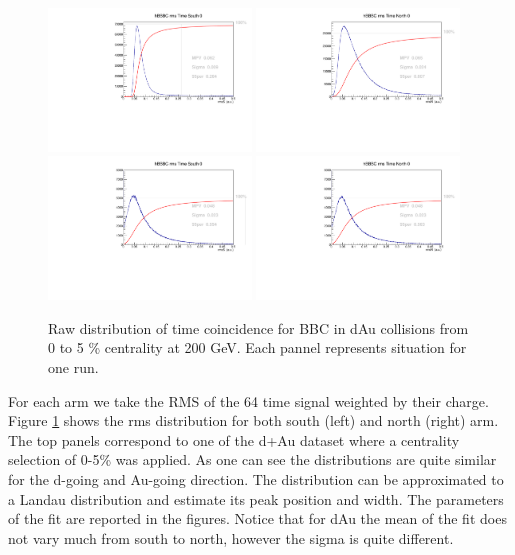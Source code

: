 \documentclass{article}
\begin{document}
\begin{figure}
\centering
\includegraphics[width=0.48\textwidth]{fig_pileup/dAu200MB_rmsSouth_455547}\hfil
\includegraphics[width=0.48\textwidth]{fig_pileup/dAu200MB_rmsNorth_455547}\\
\includegraphics[width=0.48\textwidth]{fig_pileup/pp200_rmsSouth_431739}\hfil
\includegraphics[width=0.48\textwidth]{fig_pileup/pp200_rmsNorth_431739}
\label{fig.dau200mb.bbctimetime}
\caption{Raw distribution of time coincidence for BBC in dAu collisions from 0 to 5 \% centrality at 200 GeV. Each pannel represents situation for one run.}
\end{figure}
For each arm we take the RMS of the 64 time signal weighted by their charge.
Figure \ref{fig.dau200mb.bbctimetime} shows the rms distribution for both south (left) and north (right) arm. The top panels correspond to one of the d+Au dataset where a centrality selection of 0-5\% was applied.
As one can see the distributions are quite similar for the d-going and Au-going direction.
The distribution can be approximated to a Landau distribution and estimate its peak position and width.
The parameters of the fit are reported in the figures.
Notice that for dAu the mean of the fit does not vary much from south to north, however the sigma is quite different.
\end{document}
